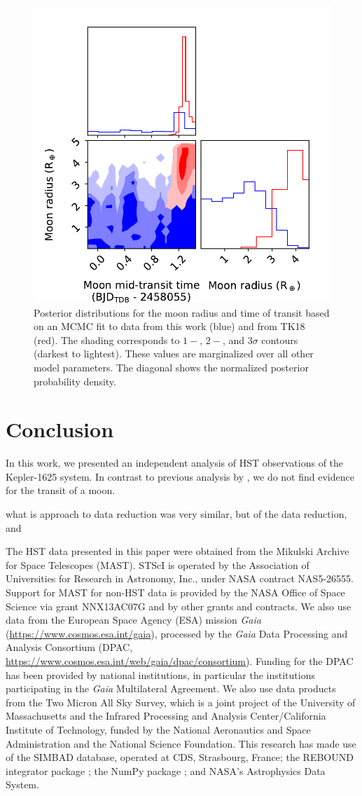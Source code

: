 \documentclass[twocolumn]{aastex62}
\begin{document}
\begin{figure}
\includegraphics[width = 0.5 \textwidth]{figures/fig5_pairs.pdf}
    \caption{Posterior distributions for the moon radius and time of transit based on an MCMC fit to data from this work (blue) and from TK18 (red). The shading corresponds to $1-$, $2-$, and $3\sigma$ contours (darkest to lightest). These values are marginalized over all other model parameters. The diagonal shows the normalized posterior probability density.}
\label{fig:corner}
\end{figure}



\section{Conclusion}
In this work, we presented an independent analysis of HST observations of the Kepler-1625 system. In contrast to previous analysis by \citep{teachey18b}, we do not find evidence for the transit of a moon.

what is 
approach to data reduction was very similar, but of the data reduction, and 


\acknowledgments
The HST data presented in this paper were obtained from the Mikulski Archive for Space Telescopes (MAST). STScI is operated by the Association of Universities for Research in Astronomy, Inc., under NASA contract NAS5-26555. Support for MAST for non-HST data is provided by the NASA Office of Space Science via grant NNX13AC07G and by other grants and contracts.  We also use data from the European Space Agency (ESA) mission {\it Gaia} (\url{https://www.cosmos.esa.int/gaia}), processed by the {\it Gaia} Data Processing and Analysis Consortium (DPAC, \url{https://www.cosmos.esa.int/web/gaia/dpac/consortium}). Funding for the DPAC has been provided by national institutions, in particular the institutions participating in the {\it Gaia} Multilateral Agreement.  We also use data products from the Two Micron All Sky Survey, which is a joint project of the University of Massachusetts and the Infrared Processing and Analysis Center/California Institute of Technology, funded by the National Aeronautics and Space Administration and the National Science Foundation.  This research has made use of the SIMBAD database, operated at CDS, Strasbourg, France; the REBOUND integrator package \citep{rein12}; the NumPy package \citep{van2011numpy}; and NASA's Astrophysics Data System. 




\end{document}

